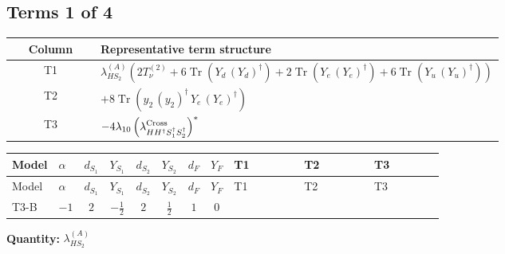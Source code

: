 \documentclass[8pt]{article}
\begin{document}
\begin{landscape}
\subsection*{Terms 1 of 4}
\begin{center}
\begin{tabular}{@{}c >{\raggedright\arraybackslash}p{0.82\linewidth}@{}}
\toprule
Column & Representative term structure \\
\midrule
T1 & \(\displaystyle {\lambda_{HS_2}^{(A)}} (2 T_{\nu}^{(2)}+6 \operatorname{Tr}\!\left({Y_d}\,\left({Y_d}\right)^{\dagger}\right)+2 \operatorname{Tr}\!\left({Y_e}\,\left({Y_e}\right)^{\dagger}\right)+6 \operatorname{Tr}\!\left({Y_u}\,\left({Y_u}\right)^{\dagger}\right))\) \\
\midrule
T2 & \(\displaystyle +8 \operatorname{Tr}\!\left({y_2}\,\left({y_2}\right)^{\dagger}\,{Y_e}\,\left({Y_e}\right)^{\dagger}\right)\) \\
\midrule
T3 & \(\displaystyle -4 {\lambda_{10}} \left({\lambda_{H H^\dagger S_1^\dagger S_2^\dagger}^{\rm Cross}}\right)^{*}\) \\
\midrule
\bottomrule
\end{tabular}
\end{center}
\smallskip
\tiny
\begin{longtable}{@{}llcccccc >{\raggedright\arraybackslash}p{0.21\linewidth} >{\raggedright\arraybackslash}p{0.21\linewidth} >{\raggedright\arraybackslash}p{0.21\linewidth}@{}}
\toprule
Model & $\alpha$ & $d_{S_1}$ & $Y_{S_1}$ & $d_{S_2}$ & $Y_{S_2}$ & $d_F$ & $Y_F$ & T1 & T2 & T3 \\
\midrule
\endfirsthead
\toprule
Model & $\alpha$ & $d_{S_1}$ & $Y_{S_1}$ & $d_{S_2}$ & $Y_{S_2}$ & $d_F$ & $Y_F$ & T1 & T2 & T3 \\
\midrule
\endhead
T3-B & $-1$ & $2$ & $-\frac{1}{2}$ & $2$ & $\frac{1}{2}$ & $1$ & $0$ & \scriptsize\adjustbox{max width=\linewidth}{$\begin{gathered} {\lambda_{HS_2}^{(A)}} (2 T_{\nu}^{(2)}+6 \operatorname{Tr}\!\left({Y_d}\,\left({Y_d}\right)^{\dagger}\right)+2 \operatorname{Tr}\!\left({Y_e}\,\left({Y_e}\right)^{\dagger}\right)+6 \operatorname{Tr}\!\left({Y_u}\,\left({Y_u}\right)^{\dagger}\right))\end{gathered}$} & \scriptsize\adjustbox{max width=\linewidth}{$\begin{gathered} +8 \operatorname{Tr}\!\left({y_2}\,\left({y_2}\right)^{\dagger}\,{Y_e}\,\left({Y_e}\right)^{\dagger}\right)\end{gathered}$} & \scriptsize\adjustbox{max width=\linewidth}{$\begin{gathered} -4 {\lambda_{10}} \left({\lambda_{H H^\dagger S_1^\dagger S_2^\dagger}^{\rm Cross}}\right)^{*}\end{gathered}$} \\
\midrule
\bottomrule
\end{longtable}
\clearpage
\noindent\textbf{Quantity: }$\lambda_{HS_2}^{(A)}$\par\smallskip

\end{landscape}
\end{document}
